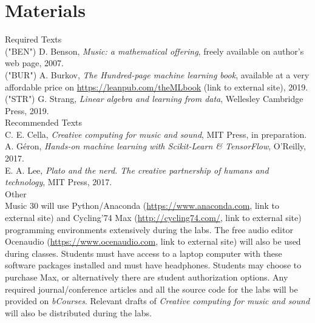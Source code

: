 \documentclass[letterpaper]{inzane_syllabus} %
\begin{document}
\vspace{0.5cm} %
\section{Materials}

{\color{myCOLOR} Required Texts}\\
("BEN") D. Benson, \textit{Music: a mathematical offering}, freely available on author's web page, 2007.\\
("BUR") A. Burkov, \textit{The Hundred-page machine learning book}, available at a very affordable price on \url{https://leanpub.com/theMLbook} (link to external site), 2019.\\
("STR") G. Strang, \textit{Linear algebra and learning from data}, Wellesley Cambridge Press, 2019.\\

{\color{myCOLOR} Recommended Texts}\\
C. E. Cella, \textit{Creative computing for music and sound}, MIT Press, in preparation. \\
A. G\'eron, \textit{Hands-on machine learning with Scikit-Learn \& TensorFlow}, O'Reilly, 2017.\\
E. A. Lee, \textit{Plato and the nerd. The creative partnership of humans and technology}, MIT Press, 2017.\\

{\color{myCOLOR} Other}\\
Music 30 will use Python/Anaconda (\url{https://www.anaconda.com}, link to external site) and Cycling’74 Max (\url{http://cycling74.com/}, link to external site) programming environments extensively during the labs. The free audio editor Ocenaudio (\url{https://www.ocenaudio.com}, link to external site) will also be used during classes. Students must have access to a laptop computer with these software packages installed and must have headphones. Students may choose to purchase Max, or alternatively there are student authorization options. Any required journal/conference articles and all the source code for the labs will be provided on \emph{bCourses}. Relevant drafts of \emph{Creative computing for music and sound} will also be distributed during the labs. 
\end{document}
